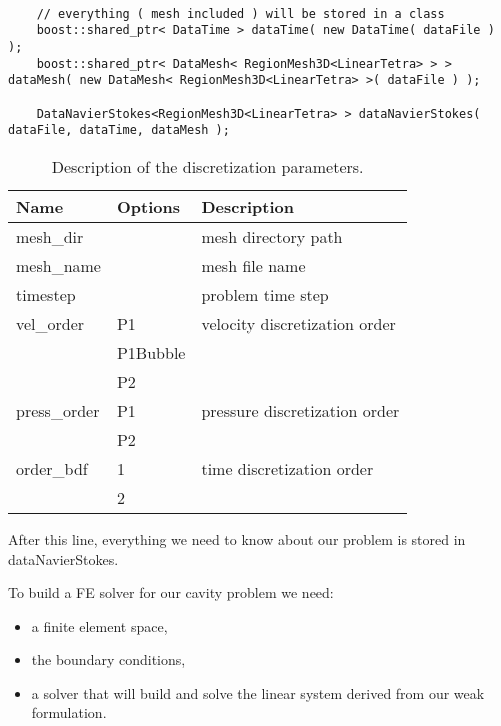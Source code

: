 \begin{verbatim}

    // everything ( mesh included ) will be stored in a class
    boost::shared_ptr< DataTime > dataTime( new DataTime( dataFile ) );
    boost::shared_ptr< DataMesh< RegionMesh3D<LinearTetra> > > dataMesh( new DataMesh< RegionMesh3D<LinearTetra> >( dataFile ) );

    DataNavierStokes<RegionMesh3D<LinearTetra> > dataNavierStokes( dataFile, dataTime, dataMesh );

\end{verbatim}

\begin{table}
\begin{center}
\begin{tabular}{|l|l|l|}
\hline
Name & Options & Description \\
\hline \hline
mesh\_dir & & mesh directory path \\ \hline
mesh\_name & & mesh file name \\ \hline
timestep & & problem time step \\ \hline
vel\_order & P1 & velocity discretization order \\ \
& P1Bubble & \\
& P2 & \\ \hline
press\_order & P1 & pressure discretization order \\
& P2 & \\ \hline
order\_bdf & 1 & time discretization order \\
& 2 & \\ \hline
\end{tabular}
\end{center}
\caption{ Description of the discretization parameters.
}
\label{table-bcparams}
\end{table}


\noindent After this line, everything we need to know about our problem is stored
in dataNavierStokes.

To build a FE solver for our cavity problem we need:
\begin{itemize}
\item a finite element space,
\item the boundary conditions,
\item a solver that will build and solve the linear system derived from our weak formulation.
\end{itemize}

